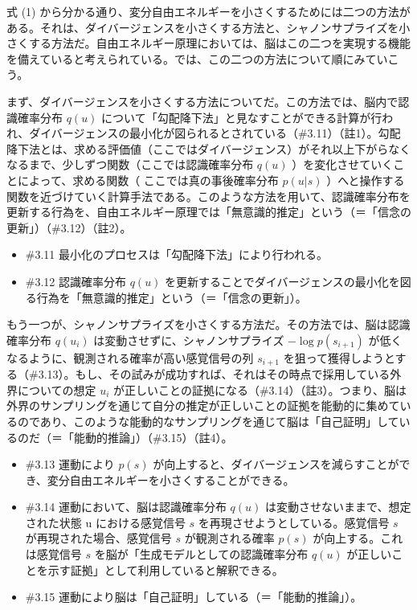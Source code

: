 式 (1)
から分かる通り、変分自由エネルギーを小さくするためには二つの方法がある。それは、ダイバージェンスを小さくする方法と、シャノンサプライズを小さくする方法だ。\mbox{自由エネルギー原理}においては、脳はこの二つを実現する機能を備えていると考えられている。では、この二つの方法について順にみていこう。

まず、ダイバージェンスを小さくする方法についてだ。この方法では、脳内で認識確率分布
\(q(u)\)
について「勾配降下法」と見なすことができる計算が行われ、ダイバージェンスの最小化が図られるとされている（\#3.11）（註1）。勾配降下法とは、求める評価値（ここではダイバージェンス）がそれ以上下がらなくなるまで、少しずつ関数（ここでは認識確率分布
\(q(u)\) ）を変化させていくことによって、求める関数（
ここでは真の事後確率分布 \(p(u|s)\)
）へと操作する関数を近づけていく計算手法である。このような方法を用いて、認識確率分布を更新する行為を、\mbox{自由エネルギー原理}では「無意識的推定」という（＝「信念の更新」）（\#3.12）（註2）。

\begin{note}{}
  \begin{itemize}
    \tightlist
    \item{\#3.11}
      最小化のプロセスは「勾配降下法」により行われる。
    \item{\#3.12}
      認識確率分布 $q(u)$ を更新することでダイバージェンスの最小化を図る行為を「無意識的推定」という（＝「信念の更新」）。
  \end{itemize}
\end{note}

もう一つが、シャノンサプライズを小さくする方法だ。その方法では、脳は認識確率分布
\(q(u_i)\) は変動させずに、シャノンサプライズ \(-\log{p(s_{i+1})}\)
が低くなるように、観測される確率が高い感覚信号の列 \(s_{i+1}\)
を狙って獲得しようとする（\#3.13）。もし、その試みが成功すれば、それはその時点で採用している外界についての想定
\(u_i\)
が正しいことの証拠になる（\#3.14）（註3）。つまり、脳は外界のサンプリングを通じて自分の推定が正しいことの証拠を能動的に集めているのであり、このような能動的なサンプリングを通じて脳は「自己証明」しているのだ（＝「能動的推論」）（\#3.15）（註4）。

\begin{note}{}
  \begin{itemize}
    \tightlist
    \item{\#3.13}
      運動により $p(s)$ が向上すると、ダイバージェンスを減らすことができ、変分自由エネルギーを小さくすることができる。
    \item{\#3.14}
      運動において、脳は認識確率分布 $q(u)$ は変動させないままで、想定された状態 u における感覚信号 $s$ を再現させようとしている。感覚信号 $s$ が再現された場合、感覚信号 $s$ が観測される確率 $p(s)$ が向上する。これは感覚信号 $s$ を脳が「生成モデルとしての認識確率分布 $q(u)$ が正しいことを示す証拠」として利用していると解釈できる。
    \item{\#3.15}
      運動により脳は「自己証明」している（＝「能動的推論」）。
  \end{itemize}
\end{note}

